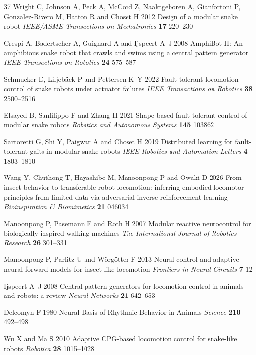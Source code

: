 \documentclass{iopjournal}
\begin{document}
\begin{thebibliography}{37}
Wright C, Johnson A, Peck A, McCord Z, Naaktgeboren A, Gianfortoni P, Gonzalez-Rivero M, Hatton R and Choset H 2012 Design of a modular snake robot {\em IEEE/ASME Transactions on Mechatronics\/} {\bf 17} 220--230

Crespi A, Badertscher A, Guignard A and Ijspeert A~J 2008 AmphiBot II: An amphibious snake robot that crawls and swims using a central pattern generator {\em IEEE Transactions on Robotics\/} {\bf 24} 575--587

Schmucker D, Liljeb{\"a}ck P and Pettersen K~Y 2022 Fault-tolerant locomotion control of snake robots under actuator failures {\em IEEE Transactions on Robotics\/} {\bf 38} 2500--2516

Elsayed B, Sanfilippo F and Zhang H 2021 Shape-based fault-tolerant control of modular snake robots {\em Robotics and Autonomous Systems\/} {\bf 145} 103862

Sartoretti G, Shi Y, Paigwar A and Choset H 2019 Distributed learning for fault-tolerant gaits in modular snake robots {\em IEEE Robotics and Automation Letters\/} {\bf 4} 1803--1810

Wang Y, Chuthong T, Hayashibe M, Manoonpong P and Owaki D 2026 From insect behavior to transferable robot locomotion: inferring embodied locomotor principles from limited data via adversarial inverse reinforcement learning {\em Bioinspiration \& Biomimetics\/} {\bf 21} 046034

Manoonpong P, Pasemann F and Roth H 2007 Modular reactive neurocontrol for biologically-inspired walking machines {\em The International Journal of Robotics Research\/} {\bf 26} 301--331

Manoonpong P, Parlitz U and W{\"o}rg{\"o}tter F 2013 Neural control and adaptive neural forward models for insect-like locomotion {\em Frontiers in Neural Circuits\/} {\bf 7} 12

Ijspeert A~J 2008 Central pattern generators for locomotion control in animals and robots: a review {\em Neural Networks\/} {\bf 21} 642--653

Delcomyn F 1980 Neural Basis of Rhythmic Behavior in Animals {\em Science\/} {\bf 210} 492--498

Wu X and Ma S 2010 Adaptive CPG-based locomotion control for snake-like robots {\em Robotica\/} {\bf 28} 1015--1028


\end{thebibliography}
\end{document}
